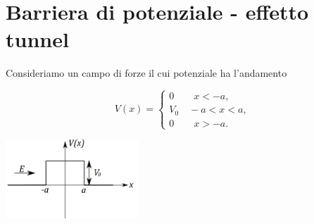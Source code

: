 \documentclass[a4paper,11pt,oneside]{book}
\begin{document}
\section{Barriera di potenziale -  effetto tunnel}
Consideriamo un campo di forze il cui potenziale ha l'andamento\\
\begin{minipage}{.55\textwidth}
\begin{equation}
V(x)=
\begin{cases}
0 \qquad x<-a,\\
V_0 \quad -a<x<a,\\
0 \qquad x>-a.
\end{cases}
\end{equation}
\end{minipage}
\hspace{.2cm}
\begin{minipage}{.4\textwidth}
\includegraphics[width=5cm]{immagini/cap_10/fig_10_8.png}
\end{minipage}\\
\end{document}

